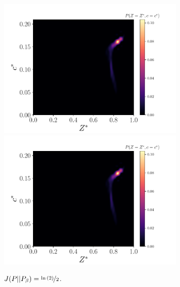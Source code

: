 \documentclass[review]{elsarticle}
\begin{document}
\begin{figure}[!tbp]
\begin{subfigure}[t]{0.32\textwidth}
    \includegraphics[page=3,width=\textwidth]{./figs/pdfs_44209.pdf}\\%
    \includegraphics[page=4,width=\textwidth]{./figs/pdfs_44209.pdf}%
    \caption{$J(P||P_{\beta})=\nicefrac{\ln{(2)}}{2}$.}\label{fig:pdfs_hilo_2}%
  \end{subfigure}\hfill%
  \begin{subfigure}[t]{0.32\textwidth}%

\end{subfigure}
\end{figure}
\end{document}
